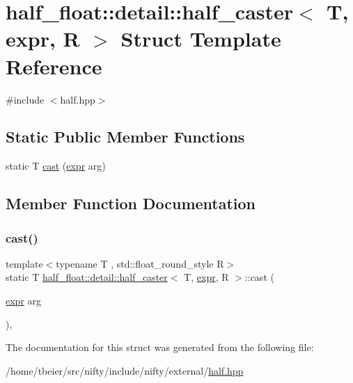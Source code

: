 \hypertarget{structhalf__float_1_1detail_1_1half__caster_3_01T_00_01expr_00_01R_01_4}{}\section{half\+\_\+float\+:\+:detail\+:\+:half\+\_\+caster$<$ T, expr, R $>$ Struct Template Reference}
\label{structhalf__float_1_1detail_1_1half__caster_3_01T_00_01expr_00_01R_01_4}


{\ttfamily \#include $<$half.\+hpp$>$}

\subsection*{Static Public Member Functions}
\begin{DoxyCompactItemize}
\item 
static T \hyperlink{structhalf__float_1_1detail_1_1half__caster_3_01T_00_01expr_00_01R_01_4_a8952ef178ea8fcc5faa71b7d6571dcd2}{cast} (\hyperlink{structhalf__float_1_1detail_1_1expr}{expr} arg)
\end{DoxyCompactItemize}


\subsection{Member Function Documentation}
\mbox{\label{structhalf__float_1_1detail_1_1half__caster_3_01T_00_01expr_00_01R_01_4_a8952ef178ea8fcc5faa71b7d6571dcd2}} 
\subsubsection{\texorpdfstring{cast()}{cast()}}
{\footnotesize\ttfamily template$<$typename T , std\+::float\+\_\+round\+\_\+style R$>$ \\
static T \hyperlink{structhalf__float_1_1detail_1_1half__caster}{half\+\_\+float\+::detail\+::half\+\_\+caster}$<$ T, \hyperlink{structhalf__float_1_1detail_1_1expr}{expr}, R $>$\+::cast (\begin{DoxyParamCaption}\item[{\hyperlink{structhalf__float_1_1detail_1_1expr}{expr}}]{arg }\end{DoxyParamCaption})\hspace{0.3cm}{\ttfamily [inline]}, {\ttfamily [static]}}



The documentation for this struct was generated from the following file\+:\begin{DoxyCompactItemize}
\item 
/home/tbeier/src/nifty/include/nifty/external/\hyperlink{half_8hpp}{half.\+hpp}\end{DoxyCompactItemize}
